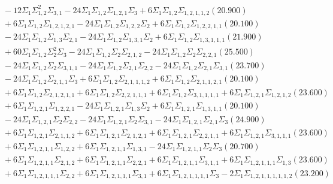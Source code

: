 \documentclass[12pt]{article}
\begin{document}
\begin{landscape}
\begin{align*}
		&\quad\quad -12\Sigma_{1}\Sigma_{1,2}^{2}\Sigma_{3,1}-24\Sigma_{1}\Sigma_{1,2}\Sigma_{1,2,1}\Sigma_{3}+6\Sigma_{1}\Sigma_{1,2}\Sigma_{1,2,1,1,2}(20.900) \\ 
		&\quad\quad +6\Sigma_{1}\Sigma_{1,2}\Sigma_{1,2,1,2,1}-24\Sigma_{1}\Sigma_{1,2}\Sigma_{1,2,2}\Sigma_{2}+6\Sigma_{1}\Sigma_{1,2}\Sigma_{1,2,2,1,1}(20.100) \\ 
		&\quad\quad -24\Sigma_{1}\Sigma_{1,2}\Sigma_{1,3}\Sigma_{2,1}-24\Sigma_{1}\Sigma_{1,2}\Sigma_{1,3,1}\Sigma_{2}+6\Sigma_{1}\Sigma_{1,2}\Sigma_{1,3,1,1,1}(21.900) \\ 
		&\quad\quad +60\Sigma_{1}\Sigma_{1,2}\Sigma_{2}^{2}\Sigma_{3}-24\Sigma_{1}\Sigma_{1,2}\Sigma_{2}\Sigma_{2,1,2}-24\Sigma_{1}\Sigma_{1,2}\Sigma_{2}\Sigma_{2,2,1}(25.500) \\ 
		&\quad\quad -24\Sigma_{1}\Sigma_{1,2}\Sigma_{2}\Sigma_{3,1,1}-24\Sigma_{1}\Sigma_{1,2}\Sigma_{2,1}\Sigma_{2,2}-24\Sigma_{1}\Sigma_{1,2}\Sigma_{2,1}\Sigma_{3,1}(23.700) \\ 
		&\quad\quad -24\Sigma_{1}\Sigma_{1,2}\Sigma_{2,1,1}\Sigma_{3}+6\Sigma_{1}\Sigma_{1,2}\Sigma_{2,1,1,1,2}+6\Sigma_{1}\Sigma_{1,2}\Sigma_{2,1,1,2,1}(20.100) \\ 
		&\quad\quad +6\Sigma_{1}\Sigma_{1,2}\Sigma_{2,1,2,1,1}+6\Sigma_{1}\Sigma_{1,2}\Sigma_{2,2,1,1,1}+6\Sigma_{1}\Sigma_{1,2}\Sigma_{3,1,1,1,1}+6\Sigma_{1}\Sigma_{1,2,1}\Sigma_{1,2,1,2}(23.600) \\ 
		&\quad\quad +6\Sigma_{1}\Sigma_{1,2,1}\Sigma_{1,2,2,1}-24\Sigma_{1}\Sigma_{1,2,1}\Sigma_{1,3}\Sigma_{2}+6\Sigma_{1}\Sigma_{1,2,1}\Sigma_{1,3,1,1}(20.100) \\ 
		&\quad\quad -24\Sigma_{1}\Sigma_{1,2,1}\Sigma_{2}\Sigma_{2,2}-24\Sigma_{1}\Sigma_{1,2,1}\Sigma_{2}\Sigma_{3,1}-24\Sigma_{1}\Sigma_{1,2,1}\Sigma_{2,1}\Sigma_{3}(24.900) \\ 
		&\quad\quad +6\Sigma_{1}\Sigma_{1,2,1}\Sigma_{2,1,1,2}+6\Sigma_{1}\Sigma_{1,2,1}\Sigma_{2,1,2,1}+6\Sigma_{1}\Sigma_{1,2,1}\Sigma_{2,2,1,1}+6\Sigma_{1}\Sigma_{1,2,1}\Sigma_{3,1,1,1}(23.600) \\ 
		&\quad\quad +6\Sigma_{1}\Sigma_{1,2,1,1}\Sigma_{1,2,2}+6\Sigma_{1}\Sigma_{1,2,1,1}\Sigma_{1,3,1}-24\Sigma_{1}\Sigma_{1,2,1,1}\Sigma_{2}\Sigma_{3}(20.700) \\ 
		&\quad\quad +6\Sigma_{1}\Sigma_{1,2,1,1}\Sigma_{2,1,2}+6\Sigma_{1}\Sigma_{1,2,1,1}\Sigma_{2,2,1}+6\Sigma_{1}\Sigma_{1,2,1,1}\Sigma_{3,1,1}+6\Sigma_{1}\Sigma_{1,2,1,1,1}\Sigma_{1,3}(23.600) \\ 
		&\quad\quad +6\Sigma_{1}\Sigma_{1,2,1,1,1}\Sigma_{2,2}+6\Sigma_{1}\Sigma_{1,2,1,1,1}\Sigma_{3,1}+6\Sigma_{1}\Sigma_{1,2,1,1,1,1}\Sigma_{3}-2\Sigma_{1}\Sigma_{1,2,1,1,1,1,1,2}(23.200) \\ 

\end{align*}
\end{landscape}
\end{document}
